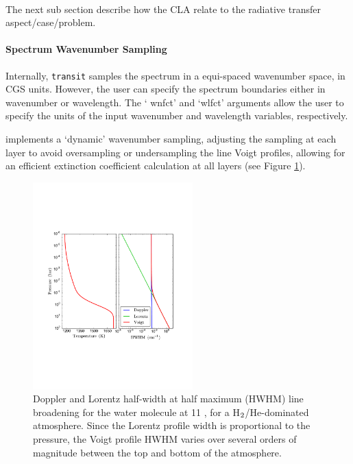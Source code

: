 \documentclass[letterpaper, 12pt]{article}
\begin{document}
 \\
The next sub section describe how the CLA relate to the radiative
transfer aspect/case/problem.

\paragraph{Spectrum Wavenumber Sampling}

Internally, {\tt transit} samples the spectrum in a equi-spaced
wavenumber space, in CGS units.  However, the user can specify the
spectrum boundaries either in wavenumber or wavelength.  The `{\tttb
  wnfct}' and `{\tttb wlfct}' arguments allow the user to specify the
units of the input wavenumber and wavelength variables, respectively.

{\transit} implements a `dynamic' wavenumber sampling, adjusting the
sampling at each layer to avoid oversampling or undersampling the line
Voigt profiles, allowing for an efficient extinction coefficient
calculation at all layers (see Figure \ref{fig:broadening}).

\begin{figure}[htb]
\centerline{
\includegraphics[width=0.55\textwidth, clip]{figs/widths.pdf}}
\caption{\small \label{fig:broadening} Doppler and Lorentz half-width
  at half maximum (HWHM) line broadening for the water molecule at 11
  {\microns}, for a H$\sb{2}$/He-dominated atmosphere.  Since the
  Lorentz profile width is proportional to the pressure, the Voigt
  profile HWHM varies over several orders of magnitude between the top
  and bottom of the atmosphere.}
\end{figure}
\end{document}
